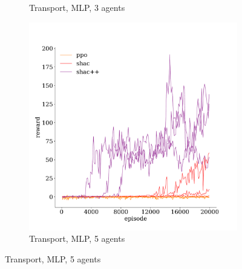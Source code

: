 \begin{figure}[t]
\begin{subfigure}[b]{0.32\textwidth}
        \caption{Transport, MLP, 3 agents}
        \label{fig:transport-mlp-3}
    \end{subfigure}
    \begin{subfigure}[b]{0.32\textwidth}
        \includegraphics[width=\textwidth]{figs/transport-5-mlp.pdf}
        \caption{Transport, MLP, 5 agents}
        \label{fig:transport-mlp-5}
    \end{subfigure}

\end{figure}
